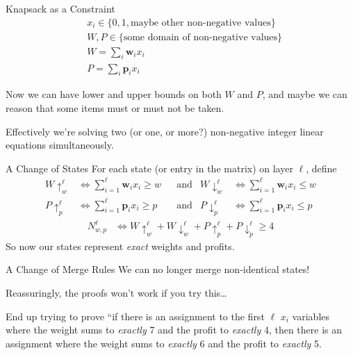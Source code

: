 \documentclass[aspectratio=169,compress,10pt]{beamer}
\begin{document}
\begin{frame}{Knapsack as a Constraint}
    \begin{align*}
        &x_i \in \{0, 1, \text{maybe other non-negative values}\}\\
        &W, P \in \{\text{some domain of non-negative values}\}\\
        &W = \sum_i \boldsymbol{w}_i x_i\\
        &P = \sum_i \boldsymbol{p}_i x_i
    \end{align*}

    Now we can have lower and upper bounds on both $W$ and $P$, and maybe we can reason that some
    items must or must not be taken.

    \medskip

    Effectively we're solving two (or one, or more?) non-negative integer linear equations simultaneously.
\end{frame}

\begin{frame}{A Change of States}
    For each state (or entry in the matrix) on layer $\ell$, define
    \begin{align*}
        W{\uparrow}^{\ell}_{w} &\Leftrightarrow \sum_{i=1}^{\ell} \boldsymbol{w}_i x_i \ge w
        &&\text{and}&
        W{\downarrow}^{\ell}_{w} &\Leftrightarrow \sum_{i=1}^{\ell} \boldsymbol{w}_i x_i \le w \\
        P{\uparrow}^{\ell}_{p} &\Leftrightarrow \sum_{i=1}^{\ell} \boldsymbol{p}_i x_i \ge p
        &&\text{and}&
        P{\downarrow}^{\ell}_{p} &\Leftrightarrow \sum_{i=1}^{\ell} \boldsymbol{p}_i x_i \le p
    \end{align*}\begin{align*}
        N^{\ell}_{w,p} & \Leftrightarrow W{\uparrow}^{\ell}_{w} + W{\downarrow}^{\ell}_{w} + P{\uparrow}^{\ell}_{p} + P{\downarrow}^{\ell}_{p} \ge 4
    \end{align*}
    So now our states represent \emph{exact} weights and profits.
\end{frame}

\begin{frame}{A Change of Merge Rules}
    We can no longer merge non-identical states!

    \bigskip

    Reassuringly, the proofs won't work if you try this\ldots

    \bigskip

    End up trying to prove ``if there is an assignment to the first $\ell$ $x_i$ variables where the weight sums to
    \emph{exactly} 7 and the profit to \emph{exactly} 4, then there is an assignment where the weight sums
    to \emph{exactly} 6 and the profit to \emph{exactly} 5.

\end{frame}
\end{document}
